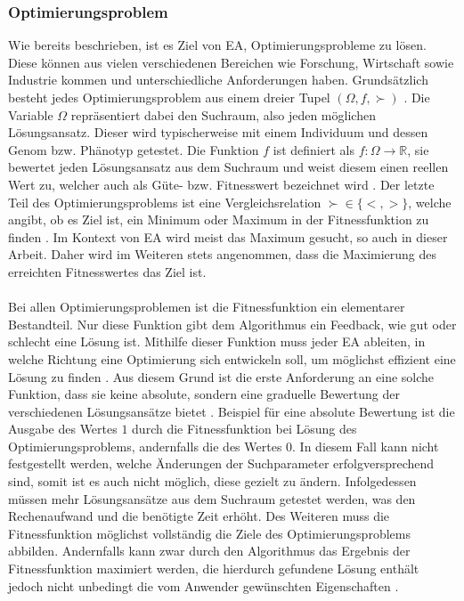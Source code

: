 \subsubsection{Optimierungsproblem}
\label{subsub:optimzation_problem}
Wie bereits beschrieben, ist es Ziel von \ac{EA}, Optimierungsprobleme zu lösen. Diese können aus vielen verschiedenen Bereichen wie Forschung, Wirtschaft sowie Industrie kommen \cite{weicker2015evolutionare} und unterschiedliche Anforderungen haben. Grundsätzlich besteht jedes Optimierungsproblem aus einem dreier Tupel $(\Omega, f, \succ)$ \cite{weicker2015evolutionare}. Die Variable $\Omega$ repräsentiert dabei den Suchraum, also jeden möglichen Lösungsansatz. Dieser wird typischerweise mit einem Individuum und dessen Genom bzw. Phänotyp getestet. Die Funktion $f$ ist definiert als $f: \Omega \rightarrow \mathbb{R}$, sie bewertet jeden Lösungsansatz aus dem Suchraum und weist diesem einen reellen Wert zu, welcher auch als Güte- bzw. Fitnesswert bezeichnet wird \cite{weicker2015evolutionare}. Der letzte Teil des Optimierungsproblems ist eine Vergleichsrelation $\succ \in \{<, >\}$, welche angibt, ob es Ziel ist, ein Minimum oder Maximum in der Fitnessfunktion zu finden \cite{weicker2015evolutionare}. Im Kontext von \ac{EA} wird meist das Maximum gesucht, so auch in dieser Arbeit. Daher wird im Weiteren stets angenommen, dass die Maximierung des erreichten Fitnesswertes das Ziel ist.
\\\\
Bei allen Optimierungsproblemen ist die Fitnessfunktion ein elementarer Bestandteil. Nur diese Funktion gibt dem Algorithmus ein Feedback, wie gut oder schlecht eine Lösung ist. Mithilfe dieser Funktion muss jeder \ac{EA} ableiten, in welche Richtung eine Optimierung sich entwickeln soll, um möglichst effizient eine Lösung zu finden \cite{weicker2015evolutionare}. Aus diesem Grund ist die erste Anforderung an eine solche Funktion, dass sie keine absolute, sondern eine graduelle Bewertung der verschiedenen Lösungsansätze bietet \cite{weicker2015evolutionare}. Beispiel für eine absolute Bewertung ist die Ausgabe des Wertes $1$ durch die Fitnessfunktion bei Lösung des Optimierungsproblems, andernfalls die des Wertes $0$. In diesem Fall kann nicht festgestellt werden, welche Änderungen der Suchparameter erfolgversprechend sind, somit ist es auch nicht möglich, diese gezielt zu ändern. Infolgedessen müssen mehr Lösungsansätze aus dem Suchraum getestet werden, was den Rechenaufwand und die benötigte Zeit erhöht. Des Weiteren muss die Fitnessfunktion möglichst vollständig die Ziele des Optimierungsproblems abbilden. Andernfalls kann zwar durch den Algorithmus das Ergebnis der Fitnessfunktion maximiert werden, die hierdurch gefundene Lösung enthält jedoch nicht unbedingt die vom Anwender gewünschten Eigenschaften \cite{weicker2015evolutionare}.

